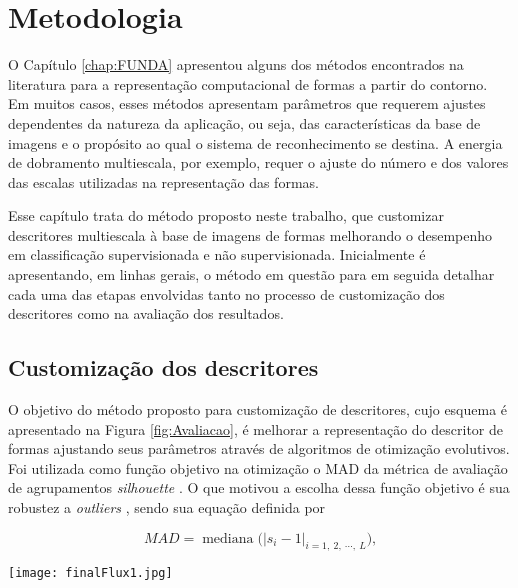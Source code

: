 \chapter{Metodologia}
\label{chap:MatMet}

O Capítulo \ref{chap:FUNDA} apresentou alguns dos métodos encontrados na literatura para a representação computacional de formas a partir do contorno.  Em muitos casos, esses métodos apresentam parâmetros que requerem ajustes dependentes da natureza da aplicação, ou seja,  das características da base de imagens e o propósito ao qual o sistema de reconhecimento se destina. A energia de dobramento multiescala, por exemplo, requer o ajuste do número e dos valores das escalas utilizadas na representação das formas. 

Esse capítulo trata do método proposto neste trabalho, que customizar descritores multiescala à base de imagens de formas melhorando o desempenho em classificação supervisionada e não supervisionada. Inicialmente é apresentando, em linhas gerais, o método em questão para em seguida detalhar cada uma das etapas envolvidas tanto no processo de customização dos descritores como na avaliação dos resultados. 

\section{Customização dos descritores\label{sec:met}}
O objetivo do método proposto para customização de descritores, cujo esquema é apresentado na Figura \ref{fig:Avaliacao}, é melhorar a representação do descritor de formas ajustando seus parâmetros através de algoritmos de otimização evolutivos. Foi utilizada como função objetivo na otimização o \ac{MAD} da métrica de avaliação de agrupamentos \textit{silhouette} \cite{Rousseeuw:1987}. O que motivou a escolha dessa função objetivo é sua robustez a \textit{outliers} \cite{Rousseeuw:1987:2}, sendo sua equação definida por

\begin{equation}
\label{eq:mad}
MAD = \operatorname{mediana}\big(|s_i - 1|_{i =1,\:2,\:\cdots,\:L}\big)\text{,}
\end{equation}

\begin{figure*}[ht]
\caption{\label{fig:Avaliacao}
 Proposta de uma metodologia para otimização evolucionária de um descritor multiescala de forma.} 
\centering
\texttt{[image: finalFlux1.jpg]}
\end{figure*}

